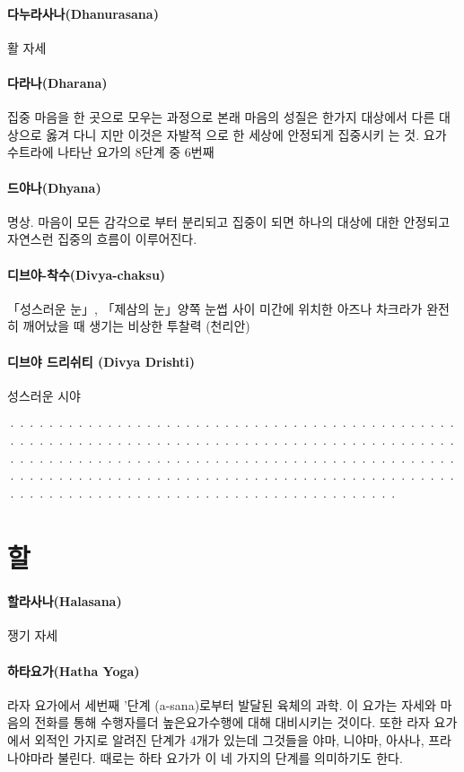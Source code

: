 \documentclass[12pt, a4paper, oneside]{book}
\let\stdsection\section
\renewcommand\section{\newpage\stdsection}
\begin{document}
\paragraph{다누라사나(Dhanurasana)}
활 자세

\paragraph{다라나(Dharana)}
집중 마음을 한 곳으로 모우는 과정으로 본래 마음의 성질은 한가지 대상에서 다른 대상으로 옳겨 다니 지만 이것은 자발적 으로 한 세상에 안정되게 집중시키   는 것. 요가 수트라에 나타난 요가의 8단계 중 6번째

\paragraph{드야나(Dhyana)}
명상. 마음이 모든 감각으로 부터 분리되고 집중이 되면 하나의 대상에 대한 안정되고 자연스런 집중의 흐름이 이루어진다.

\paragraph{디브야-착수(Divya-chaksu)}
「성스러운 눈」, 「제삼의 눈」양쪽 눈썹 사이 미간에 위치한 아즈나 차크라가 완전히 깨어났을 때 생기는 비상한 투찰력 (천리안)

\paragraph{디브야 드리쉬티 (Divya Drishti)}
성스러운 시야

································································································································································································································

\newpage
\section{할}

\paragraph{할라사나(Halasana)}
쟁기 자세

\paragraph{하타요가(Hatha Yoga)}
라자 요가에서 세번째 '단계 (a-sana)로부터 발달된 육체의 과학. 이 요가는 자세와 마음의 전화를 통해 수행자를더 높은요가수행에 대해 대비시키는 것이다. 또한 라자 요가에서 외적인 가지로 알려진 단계가 4개가 있는데 그것들을 야마, 니야마, 아사나, 프라나야마라 불린다. 때로는 하타 요가가 이 네 가지의 단계를 의미하기도 한다.
\end{document}
